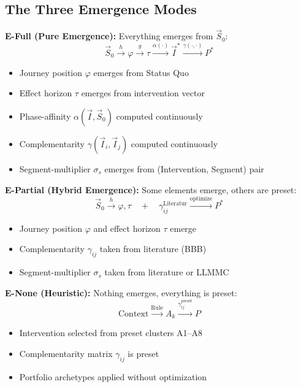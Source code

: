 \subsection{The Three Emergence Modes}
\label{sec:ie-three-modes}

\begin{tcolorbox}[colback=blue!5!white, colframe=blue!75!black,
    title=\textbf{Definition IE-D1: Emergence Modes (E-Full, E-Partial, E-None)}]

\textbf{E-Full (Pure Emergence):} Everything emerges from $\vec{S}_0$:
\begin{equation}
\vec{S}_0 \xrightarrow{h} \varphi \xrightarrow{g} \tau \xrightarrow{\alpha(\cdot)} \vec{I}^* \xrightarrow{\gamma(\cdot,\cdot)} P^*
\end{equation}
\begin{itemize}[nosep]
    \item Journey position $\varphi$ emerges from Status Quo
    \item Effect horizon $\tau$ emerges from intervention vector
    \item Phase-affinity $\alpha(\vec{I}, \vec{S}_0)$ computed continuously
    \item Complementarity $\gamma(\vec{I}_i, \vec{I}_j)$ computed continuously
    \item Segment-multiplier $\sigma_s$ emerges from (Intervention, Segment) pair
\end{itemize}

\textbf{E-Partial (Hybrid Emergence):} Some elements emerge, others are preset:
\begin{equation}
\vec{S}_0 \xrightarrow{h} \varphi, \tau \quad + \quad \gamma_{ij}^{\text{Literatur}} \xrightarrow{\text{optimize}} P^*
\end{equation}
\begin{itemize}[nosep]
    \item Journey position $\varphi$ and effect horizon $\tau$ emerge
    \item Complementarity $\gamma_{ij}$ taken from literature (BBB)
    \item Segment-multiplier $\sigma_s$ taken from literature or LLMMC
\end{itemize}

\textbf{E-None (Heuristic):} Nothing emerges, everything is preset:
\begin{equation}
\text{Context} \xrightarrow{\text{Rule}} A_k \xrightarrow{\gamma_{ij}^{\text{preset}}} P
\end{equation}
\begin{itemize}[nosep]
    \item Intervention selected from preset clusters A1--A8
    \item Complementarity matrix $\gamma_{ij}$ is preset
    \item Portfolio archetypes applied without optimization
\end{itemize}
\end{tcolorbox}

